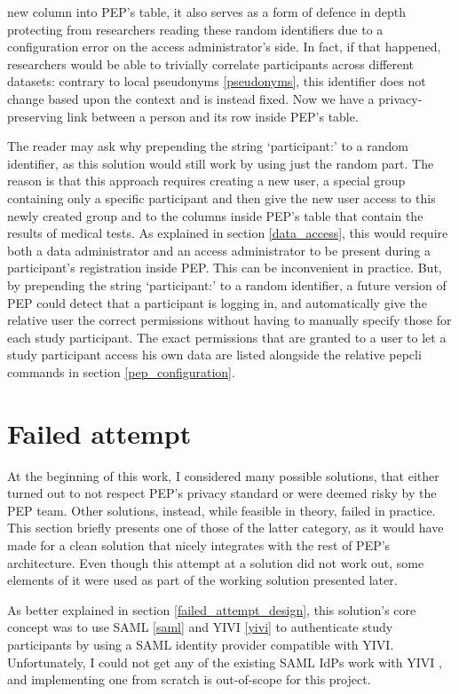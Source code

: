 \documentclass{report}
\begin{document}
new column into PEP's table, it also serves as a form of defence in depth protecting from researchers reading these random identifiers due to a configuration error on the access
administrator's side. In fact, if that happened, researchers would be able to trivially correlate participants across different datasets: contrary to local pseudonyms
\ref{pseudonyms}, this identifier does not change based upon the context and is instead fixed. Now we have a privacy-preserving link between a person and its row inside PEP's
table. \par
The reader may ask why prepending the string \enquote*{participant:} to a random identifier, as this solution would still work by using just the random part. The reason is that
this approach requires creating a new user, a special group containing only a specific participant and then give the new user access to this newly created group and to the columns
inside PEP's table that contain the results of medical tests. As explained in section \ref{data_access}, this would require both a data administrator and an access administrator to
be present during a participant's registration inside PEP. This can be inconvenient in practice. But, by prepending the string \enquote*{participant:} to a random identifier, a
future version of PEP
could detect that a participant is logging in, and automatically give the relative user the correct permissions without having to manually specify those for each study participant.
The exact permissions that are granted to a user to let a study participant access his own data are listed alongside the relative pepcli commands in section \ref{pep_configuration}.

\section{Failed attempt}
At the beginning of this work, I considered many possible solutions, that either turned out to not respect PEP's privacy standard or were deemed risky by the PEP team. Other
solutions, instead, while feasible in theory, failed in practice. This section briefly presents one of those of the latter category, as it would have made for a clean solution that
nicely integrates with the rest of PEP's architecture. Even though this attempt at a solution did not work out, some elements of it were used as part of the working solution
presented later.\par
As better explained in section \ref{failed_attempt_design}, this solution's core concept was to use SAML \ref{saml} and YIVI \ref{yivi} to authenticate study participants by using
a SAML identity provider compatible with YIVI. Unfortunately, I could not get any of the existing SAML IdPs work with YIVI , and implementing one from scratch is out-of-scope for this project.
\end{document}
